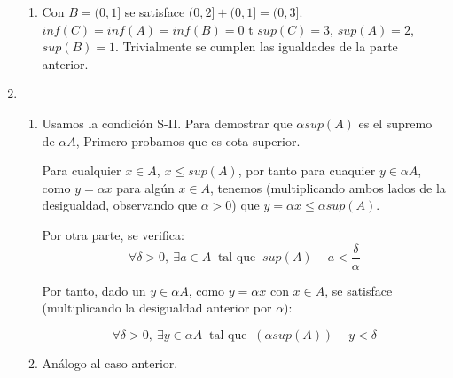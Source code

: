 \documentclass[10pt,a4paper]{article}
\begin{document}
\begin{enumerate}
\begin{enumerate}
  \item
    Con $B=(0,1]$ se satisface $(0,2] + (0,1] = (0,3]$.
    $inf(C) = inf(A) = inf(B) = 0$ t $sup(C) = 3$, $sup(A) = 2$, $sup(B)=1$.
            Trivialmente se cumplen las igualdades de la parte anterior.
  \end{enumerate}
\item
  \begin{enumerate}
  \item
    Usamos la condici\'on S-II.
    Para demostrar que $\alpha sup(A)$ es el supremo de $\alpha A$, Primero
    probamos que es cota superior.

    Para cualquier $x \in A$, $x \leq sup(A)$, por tanto para cuaquier
    $y \in \alpha A$, como $y = \alpha x$ para alg\'un $x\in A$, tenemos
    (multiplicando ambos lados de la desigualdad, observando que $\alpha >0$)
    que $y = \alpha x \leq \alpha sup(A)$.

    Por otra parte, se verifica: 
    $$\forall \delta > 0, \: \exists a \in A \: \text{ tal que }
    \: sup(A)-a < \frac{\delta}{\alpha} $$

    Por tanto, dado un $y \in \alpha A$, como $y=\alpha x$ con $x \in A$,
    se satisface (multiplicando la desigualdad anterior por $\alpha$):
    
    $$\forall \delta > 0, \: \exists y \in \alpha A \: \text{ tal que }
    \: (\alpha sup(A))-y < \delta $$
    
    
  \item
    Análogo al caso anterior.
  \end{enumerate}
\end{enumerate}
\end{document}
